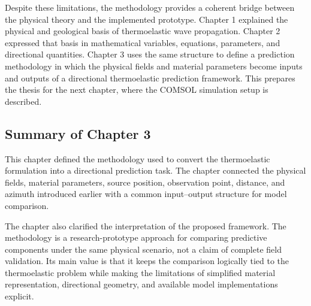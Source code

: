 Despite these limitations, the methodology provides a coherent bridge between the physical theory and the implemented prototype. Chapter 1 explained the physical and geological basis of thermoelastic wave propagation. Chapter 2 expressed that basis in mathematical variables, equations, parameters, and directional quantities. Chapter 3 uses the same structure to define a prediction methodology in which the physical fields and material parameters become inputs and outputs of a directional thermoelastic prediction framework. This prepares the thesis for the next chapter, where the COMSOL simulation setup is described.

\subsection{Summary of Chapter 3}

This chapter defined the methodology used to convert the thermoelastic formulation into a directional prediction task. The chapter connected the physical fields, material parameters, source position, observation point, distance, and azimuth introduced earlier with a common input--output structure for model comparison.

The chapter also clarified the interpretation of the proposed framework. The methodology is a research-prototype approach for comparing predictive components under the same physical scenario, not a claim of complete field validation. Its main value is that it keeps the comparison logically tied to the thermoelastic problem while making the limitations of simplified material representation, directional geometry, and available model implementations explicit.
